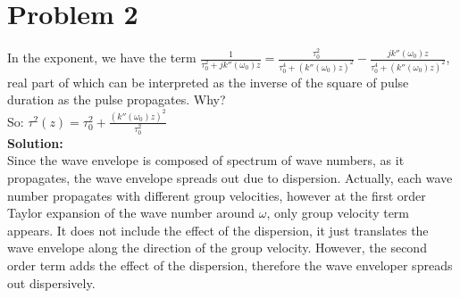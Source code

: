 \documentclass[11pt]{amsart}
\begin{document}
\section*{Problem 2 }
In the exponent, we have the term $\frac{1}{\tau_{0}^2+jk''(\omega_0)z}=\frac{\tau_{0}^2}{\tau_{0}^4+(k''(\omega_0)z)^2}-\frac{jk''(\omega_0)z}{\tau_{0}^4+(k''(\omega_0)z)^2}$, real part of which can be interpreted as the inverse of the square of pulse duration as the pulse propagates. Why?
\\
So: $\tau^2(z)=\tau_{0}^2+\frac{(k''(\omega_0)z)^2}{\tau_{0}^2}$
\\
\textbf{Solution:}\\
Since the wave envelope is composed of spectrum of wave numbers, as it propagates, the wave envelope spreads out due to dispersion. Actually, each wave number propagates with different group velocities, however at the first order Taylor expansion of the wave number around $\omega$, only group velocity term appears. It does not include the effect of the dispersion, it just translates the wave envelope along the direction of the group velocity. However, the second order term adds the effect of the dispersion, therefore the wave enveloper spreads out dispersively.
\end{document}
